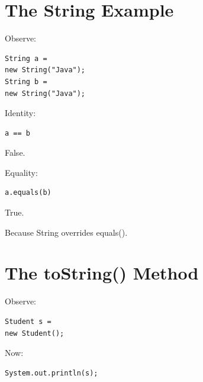 \documentclass[11pt,a4paper]{book}
\begin{document}

\section{The String Example}

Observe:

\begin{verbatim} 
String a =
new String("Java");
String b =
new String("Java");
\end{verbatim}


Identity:

\begin{verbatim} 
a == b
\end{verbatim}


False.


Equality:

\begin{verbatim} 
a.equals(b)
\end{verbatim}


True.


Because String overrides equals().


\section{The toString() Method}

Observe:

\begin{verbatim} 
Student s =
new Student();
\end{verbatim}


Now:

\begin{verbatim} 
System.out.println(s);
\end{verbatim}

\end{document}
